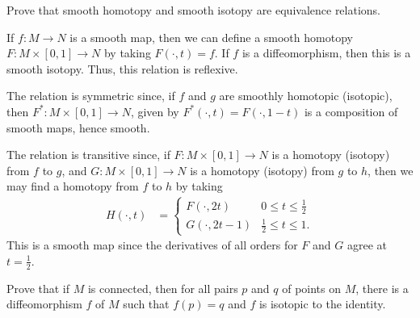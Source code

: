 \documentclass[10pt]{mypackage}
\begin{document}
\RaggedRight
\begin{problem}[Problem 1]
  Prove that smooth homotopy and smooth isotopy are equivalence relations.
\end{problem}
\begin{solution}
  If $f\colon M\rightarrow N$ is a smooth map, then we can define a smooth homotopy $F\colon M\times [0,1]\rightarrow N$ by taking $F\left( \cdot,t \right) = f$. If $f$ is a diffeomorphism, then this is a smooth isotopy. Thus, this relation is reflexive.\newline

  The relation is symmetric since, if $f$ and $g$ are smoothly homotopic (isotopic), then $F^{\ast}\colon M\times [0,1]\rightarrow N$, given by $F^{\ast}\left( \cdot,t \right) = F\left( \cdot,1-t \right)$ is a composition of smooth maps, hence smooth.\newline

  The relation is transitive since, if $F\colon M\times [0,1]\rightarrow N$ is a homotopy (isotopy) from $f$ to $g$, and $G\colon M\times [0,1]\rightarrow N$ is a homotopy (isotopy) from $g$ to $h$, then we may find a homotopy from $f$ to $h$ by taking
  \begin{align*}
    H\left( \cdot,t \right) &= \begin{cases}
      F\left( \cdot,2t \right) & 0 \leq t \leq \frac{1}{2}\\
      G\left( \cdot,2t-1 \right) & \frac{1}{2}\leq t \leq 1.
    \end{cases}
  \end{align*}
  This is a smooth map since the derivatives of all orders for $F$ and $G$ agree at $t = \frac{1}{2}$.
\end{solution}
\begin{problem}[Problem 2]
  Prove that if $M$ is connected, then for all pairs $p$ and $q$ of points on $M$, there is a diffeomorphism $f$ of $M$ such that $f(p) = q$ and $f$ is isotopic to the identity.
\end{problem}
\end{document}
